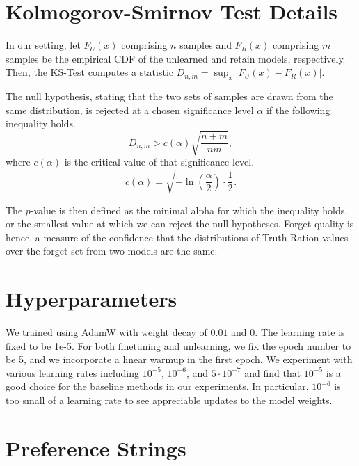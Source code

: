 \clearpage
\appendix

\section{Kolmogorov-Smirnov Test Details}
\label{sec:app-ks-test}

In our setting, let $F_U(x)$ comprising $n$ samples and $F_R(x)$ comprising $m$ samples be the empirical CDF of the unlearned and retain models, respectively.
Then, the KS-Test computes a statistic $D_{n,m} = \sup_{x} \vert F_U(x) - F_R(x) \vert$.

The null hypothesis, stating that the two sets of samples are drawn from the same distribution, is rejected at a chosen significance level $\alpha$ if the following inequality holds.
\begin{equation}
    D_{n,m} > c(\alpha) \sqrt{\frac{n + m}{nm}},
\end{equation}
where $c(\alpha)$ is the critical value of that significance level.
\begin{equation}
    c(\alpha) = \sqrt{-\ln\left(\frac{\alpha}{2}\right) \cdot \frac12}.
\end{equation}

The $p$-value is then defined as the minimal alpha for which the inequality holds, or the smallest value at which we can reject the null hypotheses.
Forget quality is hence, a measure of the confidence that the distributions of Truth Ration values over the forget set from two models are the same.

\section{Hyperparameters}
\label{sec:app-hyperparams}
We trained using AdamW with weight decay of $0.01$ and $0$. The learning rate is fixed to be 1e-5. For both finetuning and unlearning, we fix the epoch number to be 5, and we incorporate a linear warmup in the first epoch. 
We experiment with various learning rates including $10^{-5}$, $10^{-6}$, and $5\cdot10^{-7}$ and find that $10^{-5}$ is a good choice for the baseline methods in our experiments. 
In particular, $10^{-6}$ is too small of a learning rate to see appreciable updates to the model weights.

\section{Preference Strings}
\label{sec:app-idk-strings}

